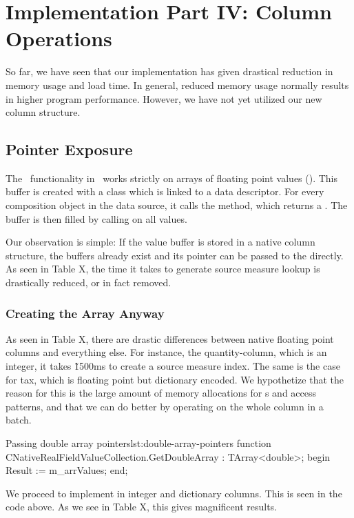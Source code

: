 \chapter{Implementation Part IV: Column Operations}
\label{chap:operations}
So far, we have seen that our implementation has given drastical reduction in memory usage and load time. In general, reduced memory usage normally results in higher program performance. However, we have not yet utilized our new column structure.

\section{Pointer Exposure}
\label{sec:Pointer Exposure}
The \bd~functionality in \gap~works strictly on arrays of floating point values (). This buffer is created with a  class which is linked to a data descriptor. For every composition object in the data source, it calls the  method, which returns a . The buffer is then filled by calling  on all values. 

Our observation is simple: If the value buffer is stored in a native column structure, the buffers already exist and its pointer can be passed to the  directly. As seen in Table X, the time it takes to generate source measure lookup is drastically reduced, or in fact removed.

\subsection{Creating the Array Anyway}
\label{sub:Creating the Array Anyway}
As seen in Table X, there are drastic differences between native floating point columns and everything else. For instance, the quantity-column, which is an integer, it takes \~ 1500ms to create a source measure index. The same is the case for tax, which is floating point but dictionary encoded. We hypothetize that the reason for this is the large amount of memory allocations for s and access patterns, and that we can do better by operating on the whole column in a batch.

\begin{delphicode}{Passing double array pointers}{lst:double-array-pointers}
function CNativeRealFieldValueCollection.GetDoubleArray
: TArray<double>;
begin
  Result := m_arrValues;
end;
\end{delphicode}
We proceed to implement  in integer and dictionary columns. This is seen in the code above. As we see in Table X, this gives magnificent results.

